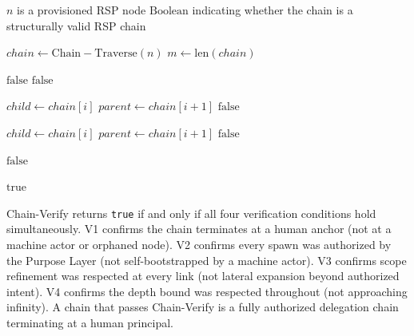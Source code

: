 \begin{algorithm}
\caption{Chain-Verify($n$) --- Verify the authorization chain from node $n$ to human anchor}
\label{alg:chain-verify}
\begin{algorithmic}[1]
\REQUIRE $n$ is a provisioned RSP node
\ENSURE $\mathrm{Boolean}$ indicating whether the chain is a structurally valid RSP chain

\STATE $chain \leftarrow \mathrm{Chain-Traverse}(n)$
\STATE $m \leftarrow \mathrm{len}(chain)$

\STATE {}
    \STATE \RETURN $\mathrm{false}$ 
\ENDIF
{}
    \STATE \RETURN $\mathrm{false}$ 
\ENDIF

\STATE {}
    \STATE $child \leftarrow chain[i]$
    \STATE $parent \leftarrow chain[i+1]$
        \STATE \RETURN $\mathrm{false}$ 
    \ENDIF
\ENDFOR

\STATE {}
    \STATE $child \leftarrow chain[i]$
    \STATE $parent \leftarrow chain[i+1]$
        \STATE \RETURN $\mathrm{false}$ 
    \ENDIF
\ENDFOR

\STATE {}
        \STATE \RETURN $\mathrm{false}$ 
    \ENDIF
\ENDFOR

\RETURN $\mathrm{true}$
\end{algorithmic}
\end{algorithm}

Chain-Verify returns \texttt{true} if and only if all four verification conditions hold simultaneously. V1 confirms the chain terminates at a human anchor (not at a machine actor or orphaned node). V2 confirms every spawn was authorized by the Purpose Layer (not self-bootstrapped by a machine actor). V3 confirms scope refinement was respected at every link (not lateral expansion beyond authorized intent). V4 confirms the depth bound was respected throughout (not approaching infinity). A chain that passes Chain-Verify is a fully authorized delegation chain terminating at a human principal.


